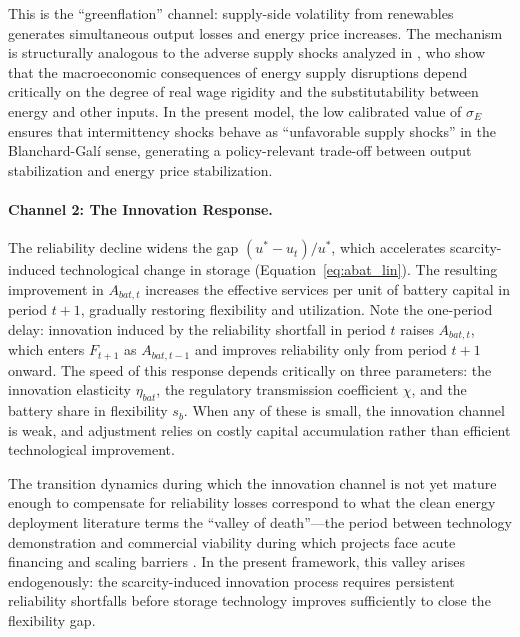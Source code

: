 \documentclass[12pt, a4paper]{article}
\begin{document}
This is the ``greenflation'' channel: supply-side volatility from renewables generates simultaneous output losses and energy price increases. The mechanism is structurally analogous to the adverse supply shocks analyzed in \citet{blanchard2007}, who show that the macroeconomic consequences of energy supply disruptions depend critically on the degree of real wage rigidity and the substitutability between energy and other inputs. In the present model, the low calibrated value of $\sigma_E$ ensures that intermittency shocks behave as ``unfavorable supply shocks'' in the Blanchard-Gal\'{i} sense, generating a policy-relevant trade-off between output stabilization and energy price stabilization.

\paragraph{Channel 2: The Innovation Response.}
The reliability decline widens the gap $(u^* - u_t)/u^*$, which accelerates scarcity-induced technological change in storage (Equation~\ref{eq:abat_lin}). The resulting improvement in $A_{bat,t}$ increases the effective services per unit of battery capital in period $t+1$, gradually restoring flexibility and utilization. Note the one-period delay: innovation induced by the reliability shortfall in period $t$ raises $A_{bat,t}$, which enters $F_{t+1}$ as $A_{bat,t-1}$ and improves reliability only from period $t+1$ onward. The speed of this response depends critically on three parameters: the innovation elasticity $\eta_{bat}$, the regulatory transmission coefficient $\chi$, and the battery share in flexibility $s_b$. When any of these is small, the innovation channel is weak, and adjustment relies on costly capital accumulation rather than efficient technological improvement.

The transition dynamics during which the innovation channel is not yet mature enough to compensate for reliability losses correspond to what the clean energy deployment literature terms the ``valley of death''---the period between technology demonstration and commercial viability during which projects face acute financing and scaling barriers \citep{nemet2018}. In the present framework, this valley arises endogenously: the scarcity-induced innovation process requires persistent reliability shortfalls before storage technology improves sufficiently to close the flexibility gap.
\end{document}
